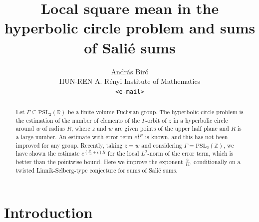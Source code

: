 \documentclass[12pt]{amsart}
\title{Local square mean in the hyperbolic circle problem and sums of Salié sums}
\author{
    András Biró\\
    HUN-REN A. Rényi Institute of Mathematics\\
    \texttt{<e-mail>}
}
\theoremstyle{definition}
\numberwithin{equation}{section}
\newcommand{\PSL}{\mathrm{PSL}}
\newcommand{\ZZ}{\mathbb{Z}}
\newcommand{\RR}{\mathbb{R}}
\newcommand{\PSLR}{\PSL_2(\RR)}
\newcommand{\PSLZ}{\PSL_2(\ZZ)}
\begin{document}
\begin{abstract}
Let $\Gamma\subseteq \PSLR$ be a finite volume Fuchsian group. The hyperbolic circle problem is the
estimation of the number of elements of the $\Gamma$-orbit of
$z$ in a hyperbolic circle around $w$ of radius $R$, where $z$ and
$w$ are given points of the upper half plane and $R$ is a
large number. An estimate with error term $e^{\frac 23R}$ is
known, and this has not been improved for any group. Recently, taking $
z=w$ and considering $\Gamma =\PSLZ$, we have shown the estimate $
e^{\left(\frac 9{14}+\epsilon\right)R}$  for the local $L^2$-norm of the error term, which is better than the pointwise bound. Here we improve the exponent
$\frac 9{14}$, conditionally on a twisted Linnik-Selberg-type conjecture for sums of Salié sums.



\end{abstract}


\maketitle



\section{Introduction}
\end{document}

